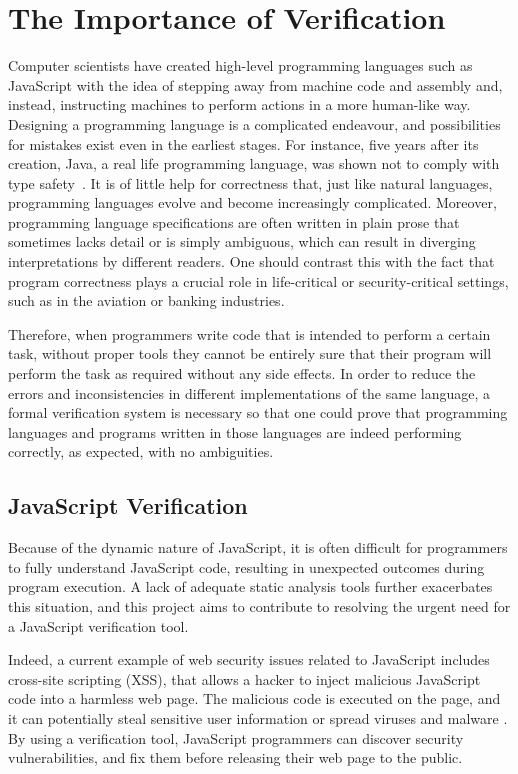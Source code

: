 \documentclass[a4paper,11pt,twoside]{report}
\begin{document}
\section{The Importance of Verification}\label{sec:jsspec}
Computer scientists have created high-level programming languages such as JavaScript with the idea of stepping away from machine code and assembly and, instead, instructing machines to perform actions in a more human-like way. Designing a programming language is a complicated endeavour, and possibilities for mistakes exist even in the earliest stages. For instance, five years after its creation, Java, a real life programming language, was shown not to comply with type safety~\cite{drossopoulou1998towards}. It is of little help for correctness that, just like natural languages, programming languages evolve and become increasingly complicated. Moreover, programming language specifications are often written in plain prose that sometimes lacks detail or is simply ambiguous, which can result in diverging interpretations by different readers. One should contrast this with the fact that program correctness plays a crucial role in life-critical or security-critical settings, such as in the aviation or banking industries.

Therefore, when programmers write code that is intended to perform a certain task, without proper tools they cannot be entirely sure that their program will perform the task as required without any side effects. In order to reduce the errors and inconsistencies in different implementations of the same language, a formal verification system is necessary so that one could prove that programming languages and programs written in those languages are indeed performing correctly, as expected, with no ambiguities.

\subsection{JavaScript Verification}
Because of the dynamic nature of JavaScript, it is often difficult for programmers to fully understand JavaScript code, resulting in unexpected outcomes during program execution. A lack of adequate static analysis tools further exacerbates this situation, and this project aims to contribute to resolving the urgent need for a JavaScript verification tool. 

Indeed, a current example of web security issues related to JavaScript includes cross-site scripting (XSS), that allows a hacker to inject malicious JavaScript code into a harmless web page. The malicious code is executed on the page, and it can potentially steal sensitive user information or spread viruses and malware \cite{security}. By using a verification tool, JavaScript programmers can discover security vulnerabilities, and fix them before releasing their web page to the public.
\end{document}
